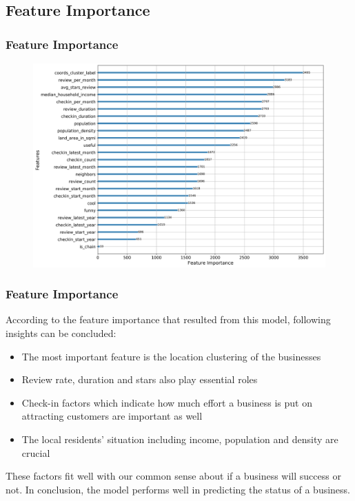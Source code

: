\documentclass{beamer}
\begin{document}
\subsection{Feature Importance}
\begin{frame}
\frametitle{Feature Importance}
\begin{figure}
\includegraphics[width=\textwidth]{importance}
\end{figure}
\end{frame}

\begin{frame}
\frametitle{Feature Importance}
According to the feature importance that resulted from this model, following insights can be concluded:\vspace{1em}
\begin{itemize}
	\item The most important feature is the location clustering of the businesses
	\item Review rate, duration and stars also play essential roles
	\item Check-in factors which indicate how much effort a business is put on attracting customers are important as well
	\item The local residents' situation including income, population and density are crucial
\end{itemize}
These factors fit well with our common sense about if a business will success or not. In conclusion, the model performs well in predicting the status of a business.
\end{frame}
\end{document}
